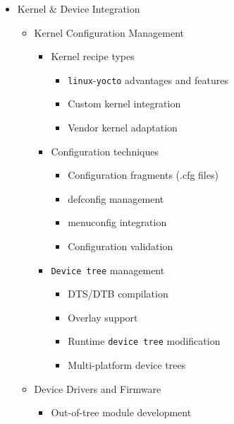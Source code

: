 \documentclass[
]{article}
\providecommand{\tightlist}{%
  \setlength{\itemsep}{0pt}\setlength{\parskip}{0pt}}
\begin{document}
\begin{itemize}
\tightlist
\item
  Kernel \& Device Integration

  \begin{itemize}
  \tightlist
  \item
    Kernel Configuration Management

    \begin{itemize}
    \tightlist
    \item
      Kernel recipe types

      \begin{itemize}
      \tightlist
      \item
        \texttt{linux}-\texttt{yocto} advantages and features
      \item
        Custom kernel integration
      \item
        Vendor kernel adaptation
      \end{itemize}
    \item
      Configuration techniques

      \begin{itemize}
      \tightlist
      \item
        Configuration fragments (.cfg files)
      \item
        defconfig management
      \item
        menuconfig integration
      \item
        Configuration validation
      \end{itemize}
    \item
      \texttt{Device\ tree} management

      \begin{itemize}
      \tightlist
      \item
        DTS/DTB compilation
      \item
        Overlay support
      \item
        Runtime \texttt{device\ tree} modification
      \item
        Multi-platform device trees
      \end{itemize}
    \end{itemize}
  \item
    Device Drivers and Firmware

    \begin{itemize}
    \tightlist
    \item
      Out-of-tree module development


\end{itemize}
\end{itemize}
\end{itemize}
\end{document}

